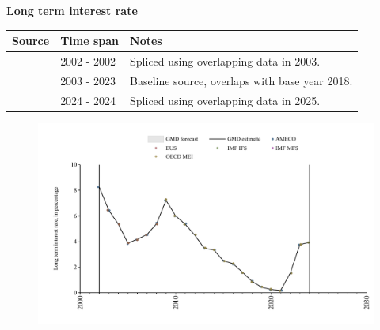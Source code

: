 \documentclass[12pt,a4paper,landscape]{article}
\begin{document}
\begin{adjustbox}{max totalsize={\paperwidth}{\paperheight},center}
\begin{minipage}[t][\textheight][t]{\textwidth}
\vspace*{0.5cm}
{}
\begin{center}
{\Large\bfseries Long term interest rate}
\end{center}
\vspace{0.5cm}
\begin{table}[H]
\centering
\small
\begin{tabular}{|l|l|l|}
\hline
\textbf{Source} & \textbf{Time span} & \textbf{Notes} \\
\hline
\rowcolor{white}\cite{AMECO}& 2002 - 2002 &Spliced using overlapping data in 2003. \\
\rowcolor{lightgray}\cite{OECD_MEI}& 2003 - 2023 &Baseline source, overlaps with base year 2018. \\
\rowcolor{white}\cite{EUS}& 2024 - 2024 &Spliced using overlapping data in 2025. \\
\hline
\end{tabular}
\end{table}
\begin{figure}[H]
\centering
\includegraphics[width=\textwidth,height=0.6\textheight,keepaspectratio]{graphs/BGR_ltrate.pdf}
\end{figure}
\end{minipage}
\end{adjustbox}
\end{document}

